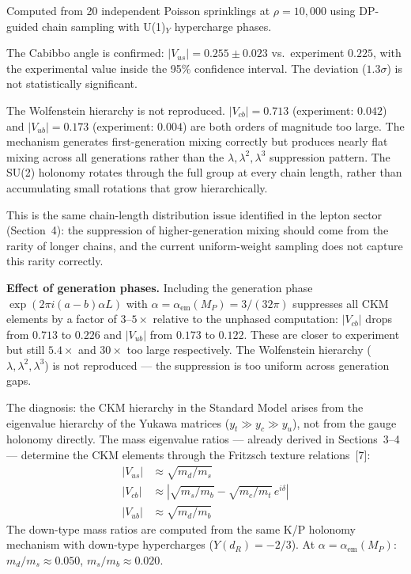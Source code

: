 \documentclass[11pt,letterpaper]{article}
\begin{document}
\noindent Computed from 20 independent Poisson sprinklings at
$\rho = 10{,}000$ using DP-guided chain sampling with U(1)$_Y$
hypercharge phases.

The Cabibbo angle is confirmed: $|V_{us}| = 0.255 \pm 0.023$ vs.\
experiment $0.225$, with the experimental value inside the 95\%
confidence interval. The deviation ($1.3\sigma$) is not statistically
significant.

The Wolfenstein hierarchy is not reproduced. $|V_{cb}| = 0.713$
(experiment: $0.042$) and $|V_{ub}| = 0.173$ (experiment: $0.004$)
are both orders of magnitude too large. The mechanism generates
first-generation mixing correctly but produces nearly flat mixing across
all generations rather than the $\lambda, \lambda^2, \lambda^3$
suppression pattern. The SU(2) holonomy rotates through the full group
at every chain length, rather than accumulating small rotations that
grow hierarchically.

This is the same chain-length distribution issue identified in the
lepton sector (Section~4): the suppression of higher-generation mixing
should come from the rarity of longer chains, and the current
uniform-weight sampling does not capture this rarity correctly.

\medskip
\noindent\textbf{Effect of generation phases.}
Including the generation phase $\exp(2\pi i (a-b) \alpha L)$ with
$\alpha = \alpha_{\mathrm{em}}(M_P) = 3/(32\pi)$ suppresses all CKM
elements by a factor of $3$--$5\times$ relative to the unphased
computation: $|V_{cb}|$ drops from $0.713$ to $0.226$ and $|V_{ub}|$
from $0.173$ to $0.122$.  These are closer to experiment but still
$5.4\times$ and $30\times$ too large respectively.  The Wolfenstein
hierarchy ($\lambda, \lambda^2, \lambda^3$) is not reproduced --- the
suppression is too uniform across generation gaps.

The diagnosis: the CKM hierarchy in the Standard Model arises from
the eigenvalue hierarchy of the Yukawa matrices ($y_t \gg y_c \gg
y_u$), not from the gauge holonomy directly.  The mass eigenvalue
ratios --- already derived in Sections~3--4 --- determine the CKM
elements through the Fritzsch texture relations~[7]:
\begin{align}
  |V_{us}| &\approx \sqrt{m_d/m_s} \label{eq:vus_fritzsch} \\
  |V_{cb}| &\approx \left|\sqrt{m_s/m_b} -
    \sqrt{m_c/m_t}\,e^{i\delta}\right| \label{eq:vcb_fritzsch} \\
  |V_{ub}| &\approx \sqrt{m_d/m_b} \label{eq:vub_fritzsch}
\end{align}
The down-type mass ratios are computed from the same K/P holonomy
mechanism with down-type hypercharges ($Y(d_R) = -2/3$).  At
$\alpha = \alpha_{\mathrm{em}}(M_P)$: $m_d/m_s \approx 0.050$,
$m_s/m_b \approx 0.020$.
\end{document}
